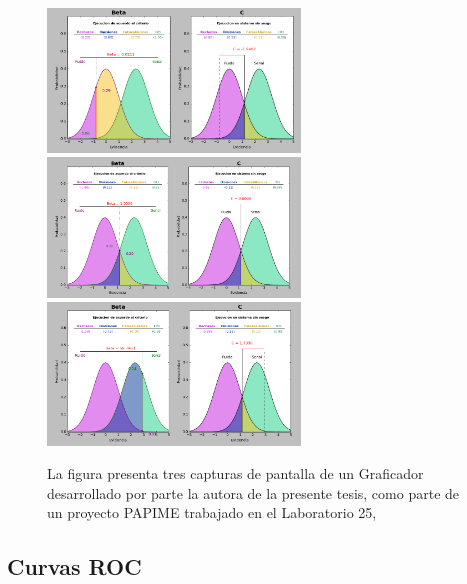 \begin{itemize}
\begin{figure}[th]
\centering
\includegraphics[width=0.60\textwidth]{Figures/Graficador_Sesgo_Liberal}\\
\includegraphics[width=0.60\textwidth]{Figures/Graficador_Sesgo_Neutro}\\
\includegraphics[width=0.60\textwidth]{Figures/Graficador_Sesgo_Conservador}\\
\caption[Estimación del sesgo con base en el criterio]{La figura presenta tres capturas de pantalla de un Graficador desarrollado por parte la autora de la presente tesis, como parte de un proyecto PAPIME trabajado en el Laboratorio 25, \parencite{PAPIME}}
\label{fig:Graf_Sesgo}
\end{figure}
\end{itemize}   %


\subsection{Curvas ROC}

